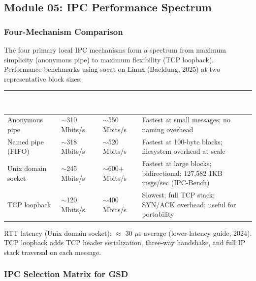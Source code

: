 \documentclass[11pt,letterpaper]{article}
\newcommand{\tableheader}[1]{\textbf{\sffamily\textcolor{white}{#1}}}
\begin{document}
\subsection{Module 05: IPC Performance Spectrum}

\subsubsection{Four-Mechanism Comparison}

The four primary local IPC mechanisms form a spectrum from maximum simplicity (anonymous pipe) to maximum flexibility (TCP loopback). Performance benchmarks using socat on Linux (Baeldung, 2025) at two representative block sizes:

\begin{center}
\begin{tabularx}{\textwidth}{L{3cm}C{2.5cm}C{2.5cm}X}
\toprule
{}
\tableheader{Mechanism} & \tableheader{100-byte blocks} & \tableheader{1 MB blocks} & \tableheader{Notes} \\
\midrule
Anonymous pipe & $\sim$310 Mbits/s & $\sim$550 Mbits/s & Fastest at small messages; no naming overhead \\
Named pipe (FIFO) & $\sim$318 Mbits/s & $\sim$520 Mbits/s & Fastest at 100-byte blocks; filesystem overhead at scale \\
Unix domain socket & $\sim$245 Mbits/s & $\sim$600+ Mbits/s & Fastest at large blocks; bidirectional; 127,582 1KB msgs/sec (IPC-Bench) \\
TCP loopback & $\sim$120 Mbits/s & $\sim$400 Mbits/s & Slowest; full TCP stack; SYN/ACK overhead; useful for portability \\
\bottomrule
\end{tabularx}
\end{center}

RTT latency (Unix domain socket): $\approx$ 30 $\mu$s average (lower-latency guide, 2024). TCP loopback adds TCP header serialization, three-way handshake, and full IP stack traversal on each message.

\subsubsection{IPC Selection Matrix for GSD}
\end{document}
